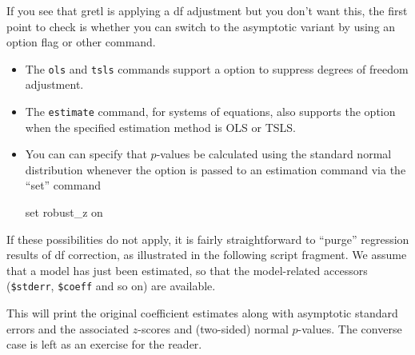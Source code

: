 If you see that gretl is applying a df adjustment but you don't want
this, the first point to check is whether you can switch to the
asymptotic variant by using an option flag or other command.
\begin{itemize}
\item The \texttt{ols} and \texttt{tsls} commands support a
   option to suppress degrees of freedom
  adjustment.
\item The \texttt{estimate} command, for systems of equations, also
  supports the  option when the specified
  estimation method is OLS or TSLS.
\item You can can specify that $p$-values be calculated using the
  standard normal distribution whenever the  option is
  passed to an estimation command via the ``set'' command
%
\begin{code}
set robust_z on
\end{code}
\end{itemize}

If these possibilities do not apply, it is fairly straightforward to
``purge'' regression results of df correction, as illustrated in the
following script fragment. We assume that a model has just been
estimated, so that the model-related accessors
(\verb|$stderr|, \verb|$coeff| and so on) are available.
%

This will print the original coefficient estimates along with
asymptotic standard errors and the associated
$z$-scores and (two-sided) normal $p$-values. The converse case is
left as an exercise for the reader.


